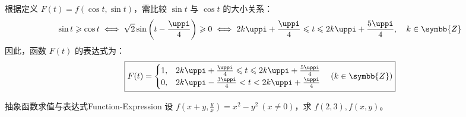 \begin{solution}
    根据定义 $F(t) = f(\cos t, \sin t)$，需比较 $\sin t$ 与 $\cos t$ 的大小关系：
    \begin{equation}
        \sin t \geqslant \cos t \iff \sqrt{2}\sin\left( t - \frac{\uppi}{4} \right) \geqslant 0 \iff 2k\uppi + \frac{\uppi}{4} \leqslant t \leqslant 2k\uppi + \frac{5\uppi}{4}, \quad k \in \symbb{Z}
    \end{equation}
    因此，函数 $F(t)$ 的表达式为：
    \begin{equation}
        \boxed{F(t) = \begin{cases} 1, & 2k\uppi + \frac{\uppi}{4} \leqslant t \leqslant 2k\uppi + \frac{5\uppi}{4} \\ 0, & 2k\uppi - \frac{3\uppi}{4} < t < 2k\uppi + \frac{\uppi}{4} \end{cases} \quad (k \in \symbb{Z})}
    \end{equation}
\end{solution}

\begin{problem}{抽象函数求值与表达式}{Function-Expression}
    设 $f(x + y, \frac{y}{x}) = x^2 - y^2 \ (x \neq 0)$，求 $f(2, 3), f(x, y)$。
\end{problem}

